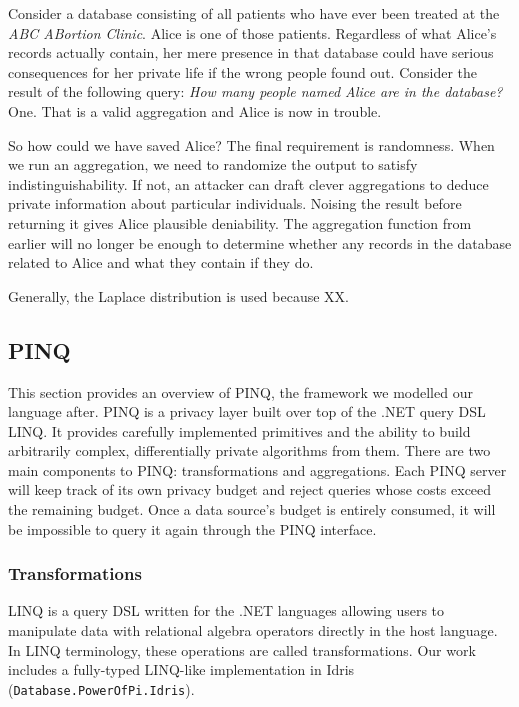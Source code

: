 \documentclass[12pt]{article}
\begin{document}
Consider a database consisting of all patients who have ever been treated at the \textit{ABC ABortion Clinic}.
Alice is one of those patients.
Regardless of what Alice's records actually contain, her mere presence in that database could have serious consequences for her private life if the wrong people found out.
Consider the result of the following query: \textit{How many people named Alice are in the database?}
One.
That is a valid aggregation and Alice is now in trouble.

So how could we have saved Alice?
The final requirement is randomness.
When we run an aggregation, we need to randomize the output to satisfy indistinguishability.
If not, an attacker can draft clever aggregations to deduce private information about particular individuals.
Noising the result before returning it gives Alice plausible deniability.
The aggregation function from earlier will no longer be enough to determine whether any records in the database related to Alice and what they contain if they do.

Generally, the Laplace distribution is used because XX.

\subsection{PINQ}\label{sec:pinq}

This section provides an overview of PINQ, the framework we modelled our language after.
PINQ is a privacy layer built over top of the .NET query DSL LINQ.
It provides carefully implemented primitives and the ability to build arbitrarily complex, differentially private algorithms from them.
There are two main components to PINQ: transformations and aggregations.
Each PINQ server will keep track of its own privacy budget and reject queries whose costs exceed the remaining budget.
Once a data source's budget is entirely consumed, it will be impossible to query it again through the PINQ interface.

\subsubsection{Transformations}

LINQ is a query DSL written for the .NET languages allowing users to manipulate data with relational algebra operators directly in the host language.
In LINQ terminology, these operations are called transformations.
Our work includes a fully-typed LINQ-like implementation in Idris (\texttt{Database.PowerOfPi.Idris}).
\end{document}
